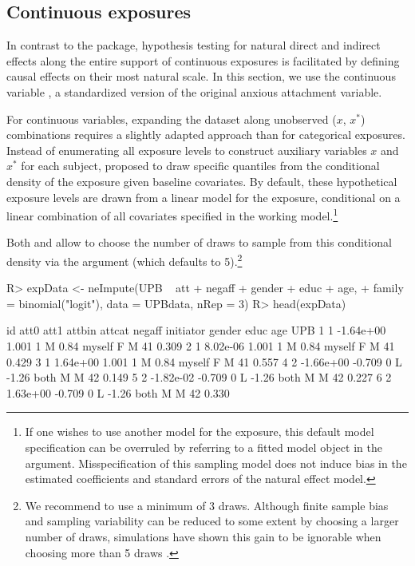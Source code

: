 \documentclass[nojss]{jss}
\begin{document}
\subsection{Continuous exposures}\label{contexp}
In contrast to the  package, hypothesis testing for natural direct and indirect effects along the entire support of continuous exposures is facilitated by defining causal effects on their most natural scale. In this section, we use the continuous variable , a standardized version of the original anxious attachment variable. 
\par For continuous variables, expanding the dataset along unobserved ($x$, $x^*$) combinations requires a slightly adapted approach than for categorical exposures. Instead of enumerating all exposure levels to construct auxiliary variables $x$ and $x^*$ for each subject, \cite{Vansteelandt2012} proposed to draw specific quantiles from the conditional density of the exposure given baseline covariates. By default, these hypothetical exposure levels are drawn from a linear model for the exposure, conditional on a linear combination of all covariates specified in the working model.\footnote{If one wishes to use another model for the exposure, this default model specification can be overruled by referring to a fitted model object in the  argument. Misspecification of this sampling model does not induce bias in the estimated coefficients and standard errors of the natural effect model.}
\par Both  and  allow to choose the number of draws to sample from this conditional density via the  argument (which defaults to 5).\footnote{We recommend to use a minimum of 3 draws. Although finite sample bias and sampling variability can be reduced to some extent by choosing a larger number of draws, simulations have shown this gain to be ignorable when choosing more than 5 draws \citep{Vansteelandt2012}.}
\begin{Schunk}
\begin{Sinput}
R> expData <- neImpute(UPB ~ att + negaff + gender + educ + age, 
+    family = binomial("logit"), data = UPBdata, nRep = 3)
R> head(expData)
\end{Sinput}
\begin{Soutput}
  id      att0   att1 attbin attcat negaff initiator gender educ age   UPB
1  1 -1.64e+00  1.001      1      M   0.84    myself      F    M  41 0.309
2  1  8.02e-06  1.001      1      M   0.84    myself      F    M  41 0.429
3  1  1.64e+00  1.001      1      M   0.84    myself      F    M  41 0.557
4  2 -1.66e+00 -0.709      0      L  -1.26      both      M    M  42 0.149
5  2 -1.82e-02 -0.709      0      L  -1.26      both      M    M  42 0.227
6  2  1.63e+00 -0.709      0      L  -1.26      both      M    M  42 0.330
\end{Soutput}
\end{Schunk}
\end{document}
